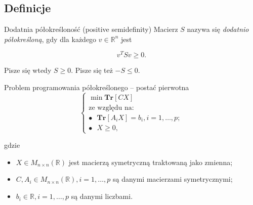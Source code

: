\documentclass{beamer}
\begin{document}
\subsection{Definicje}

\begin{frame}
    \begin{exampleblock}{Dodatnia półokreśloność (positive semidefinity)}
        Macierz $S$ nazywa się \textit{dodatnio półokreśloną}, gdy dla każdego $v \in \mathbb{R} ^ {n}$ jest

        $$
            v ^ {T} S v \geq 0.
        $$

        Pisze się wtedy $S \geq 0$. Pisze się też $-S \leq 0$.
    \end{exampleblock}
\end{frame}

\begin{frame}
    \begin{exampleblock}{Problem programowania półokreślonego -- postać pierwotna}
        $$
            \begin{cases}
                \min \textbf{Tr}[CX] \\
                \text{ze względu na:} \\
                    \bullet \text{      } \textbf{Tr}[A_{i} X] = b_{i}, i=1, \ldots, p; \\
                    \bullet \text{      } X \geq 0,
            \end{cases}
        $$

        gdzie

        \begin{itemize}
            \item $X \in M_{n \times n}(\mathbb{R})$ jest macierzą symetryczną traktowaną jako zmienna;
            \item $C, A_{i} \in M_{n \times n}(\mathbb{R}), i = 1, \ldots, p$ są danymi macierzami symetrycznymi;
            \item $b_{i} \in \mathbb{R}, i = 1, \ldots, p$ są danymi liczbami.  
        \end{itemize}
    \end{exampleblock}
\end{frame}
\end{document}
